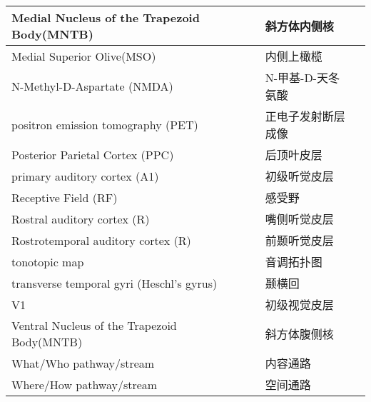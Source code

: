 \begin{table}[htbp]
{\begin{tabular}{llll}
		\midrule
		Medial Nucleus of the Trapezoid Body(MNTB)   && 斜方体内侧核  \\
		
		\midrule
		Medial Superior 		Olive(MSO)   && 内侧上橄榄  \\
		
		\midrule
		N-Methyl-D-Aspartate (NMDA)   && N-甲基-D-天冬氨酸  \\
		
		\midrule
		positron emission tomography (PET)     && 正电子发射断层成像   \\
		
		\midrule
		Posterior Parietal Cortex (PPC)     && 后顶叶皮层   \\
		
		\midrule
		primary auditory cortex (A1)   && 初级听觉皮层  \\
		
		\midrule
		Receptive Field (RF)   && 感受野  \\
		
		\midrule
		Rostral auditory cortex (R)   && 嘴侧听觉皮层  \\
		
		\midrule
		Rostrotemporal auditory cortex (R)   && 前颞听觉皮层 \\
		
		\midrule
		tonotopic map   && 音调拓扑图  \\
		
		\midrule
		transverse temporal gyri (Heschl's gyrus)   && 颞横回  \\
		
		\midrule
		V1   && 初级视觉皮层  \\
		
		\midrule
		Ventral Nucleus of the Trapezoid Body(MNTB)   && 斜方体腹侧核  \\
		
		\midrule
		What/Who pathway/stream  && 内容通路  \\
		
		\midrule
		Where/How pathway/stream && 空间通路  \\
		
		
		\bottomrule  

	\end{tabular}}
\end{table}%

